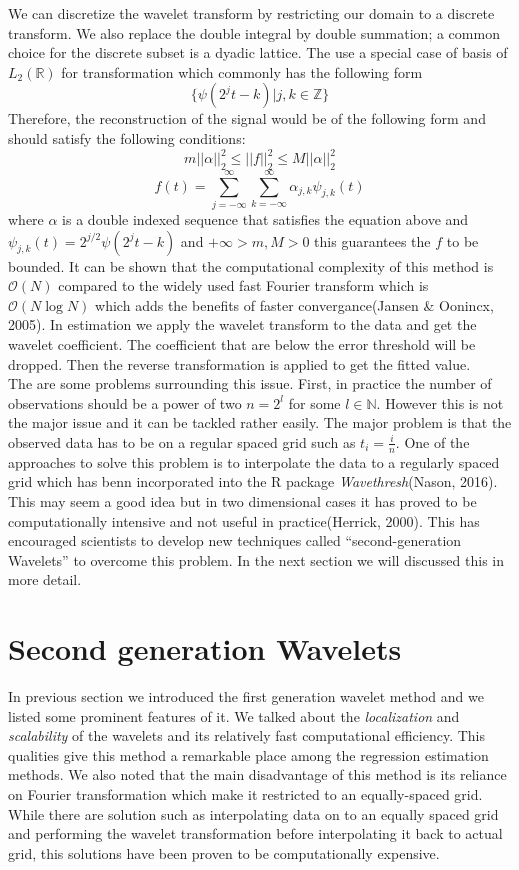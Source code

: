\documentclass[12pt,twoside, a4paper]{reedthesis}
\begin{document}
We can discretize the wavelet transform by restricting our domain to a discrete transform. We also replace the double integral by double summation; a common choice for the discrete subset is a dyadic lattice. The use a special case of basis of \(L_2(\mathbb{R})\) for transformation which commonly has the following form \[\{\psi(2^jt-k)|j,k\in\mathbb{Z}\}\]
Therefore, the reconstruction of the signal would be of the following form and should satisfy the following conditions:
\[m||\alpha||^2_2 \leq ||f||^2_2 \leq M||\alpha||^2_2 \]
\[f(t)=\sum_{j=-\infty}^{\infty}\sum_{k=-\infty}^{\infty}\alpha_{j,k}\psi_{j,k}(t)\]
where \(\alpha\) is a double indexed sequence that satisfies the equation above and \(\psi_{j,k}(t)=2^{j/2}\psi(2^{j}t-k)\)
and \(+\infty>m,M>0\) this guarantees the \(f\) to be bounded. It can be shown that the computational complexity of this method is \(\mathcal{O}(N)\) compared to the widely used fast Fourier transform which is \(\mathcal{O}(N\log N)\) which adds the benefits of faster convergance(Jansen \& Oonincx, 2005). In estimation we apply the wavelet transform to the data and get the wavelet coefficient. The coefficient that are below the error threshold will be dropped. Then the reverse transformation is applied to get the fitted value.\\
The are some problems surrounding this issue. First, in practice the number of observations should be a power of two \(n=2^l\) for some \(l\in \mathbb{N}\). However this is not the major issue and it can be tackled rather easily. The major problem is that the observed data has to be on a regular spaced grid such as \(t_i=\frac{i}{n}\). One of the approaches to solve this problem is to interpolate the data to a regularly spaced grid which has benn incorporated into the R package \emph{Wavethresh}(Nason, 2016). This may seem a good idea but in two dimensional cases it has proved to be computationally intensive and not useful in practice(Herrick, 2000). This has encouraged scientists to develop new techniques called ``second-generation Wavelets'' to overcome this problem. In the next section we will discussed this in more detail.

\hypertarget{second-generation-wavelets}{%
\section{Second generation Wavelets}\label{second-generation-wavelets}}

In previous section we introduced the first generation wavelet method and we listed some prominent features of it. We talked about the \emph{localization} and \emph{scalability} of the wavelets and its relatively fast computational efficiency. This qualities give this method a remarkable place among the regression estimation methods. We also noted that the main disadvantage of this method is its reliance on Fourier transformation which make it restricted to an equally-spaced grid. While there are solution such as interpolating data on to an equally spaced grid and performing the wavelet transformation before interpolating it back to actual grid, this solutions have been proven to be computationally expensive.
\end{document}
